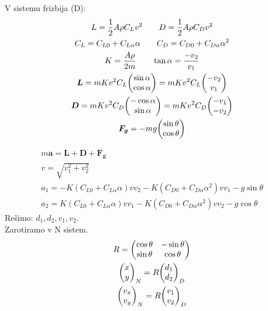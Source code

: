 \documentclass[11pt,a4paper]{article}
\begin{document}
V sistemu frizbija (D):
\begin{gather}
L = \dfrac{1}{2} A \rho C_L v^2 \qquad D = \dfrac{1}{2} A \rho C_D v^2\\
C_L = C_{L0} + C_{L \alpha} \alpha \qquad C_D = C_{D0} + C_{D \alpha} \alpha^2\\
K = \dfrac{A \rho}{2 m} \qquad \tan \alpha = \dfrac{-v_2}{v_1}\\
\bm L = m K v^2 C_L \mqty(\sin \alpha \\ \cos \alpha) = m K v^2 C_L \mqty(-v_2 \\ v_1\\)\\
\bm D = m K v^2 C_D \mqty(-\cos \alpha \\ \sin \alpha) = m K v^2 C_D \mqty(-v_1 \\ -v_2\\)\\
\bm F_{\bm g} = - m g  \mqty(\sin \theta \\ \cos \theta)
\end{gather}

\begin{gather}
m \bm a = \bm L + \bm D + \bm F_{\bm g}\\
v = \sqrt{v_1^2 + v_2^2}\\
a_1 = -K (C_{L0} + C_{L \alpha} \alpha) v v_2 - K (C_{D0} + C_{D \alpha} \alpha^2) v v_1 - g \sin \theta\\
a_2 = K (C_{L0} + C_{L \alpha} \alpha) v v_1 - K (C_{D0} + C_{D \alpha} \alpha^2) v v_2 - g \cos\theta
\end{gather}
Rešimo: \(d_1, d_2, v_1, v_2 \).\\
Zarotiramo v N sistem.
\begin{gather}
R = \mqty(\cos \theta & -\sin \theta \\ \sin \theta & \cos \theta)\\
\mqty(x \\ y)_N = R \mqty(d_1 \\ d_2)_D\\
\mqty(v_x \\ v_y)_N = R \mqty(v_1 \\ v_2)_D
\end{gather}
\end{document}
